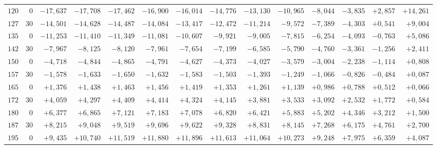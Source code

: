 \begin{landscape}
\begin{longtable}{@{}rr|r|r|r|r|r|r|r|r|r|r|r|r@{}}
\(120\) & \(0\) & \(-17{,}637\) & \(-17{,}708\) & \(-17{,}462\) & \(-16{,}900\) & \(-16{,}014\) & \(-14{,}776\) & \(-13{,}130\) & \(-10{,}965\) & \(-8{,}044\) & \(-3{,}835\) & \(+2{,}857\) & \(+14{,}261\)\\
\(127\) & \(30\) & \(-14{,}501\) & \(-14{,}628\) & \(-14{,}487\) & \(-14{,}084\) & \(-13{,}417\) & \(-12{,}472\) & \(-11{,}214\) & \(-9{,}572\) & \(-7{,}389\) & \(-4{,}303\) & \(+0{,}541\) & \(+9{,}004\)\\
\(135\) & \(0\) & \(-11{,}253\) & \(-11{,}410\) & \(-11{,}349\) & \(-11{,}081\) & \(-10{,}607\) & \(-9{,}921\) & \(-9{,}005\) & \(-7{,}815\) & \(-6{,}254\) & \(-4{,}093\) & \(-0{,}763\) & \(+5{,}086\)\\
\(142\) & \(30\) & \(-7{,}967\) & \(-8{,}125\) & \(-8{,}120\) & \(-7{,}961\) & \(-7{,}654\) & \(-7{,}199\) & \(-6{,}585\) & \(-5{,}790\) & \(-4{,}760\) & \(-3{,}361\) & \(-1{,}256\) & \(+2{,}411\)\\[2pt]
\(150\) & \(0\) & \(-4{,}718\) & \(-4{,}844\) & \(-4{,}865\) & \(-4{,}791\) & \(-4{,}627\) & \(-4{,}373\) & \(-4{,}027\) & \(-3{,}579\) & \(-3{,}004\) & \(-2{,}238\) & \(-1{,}114\) & \(+0{,}808\)\\
\(157\) & \(30\) & \(-1{,}578\) & \(-1{,}633\) & \(-1{,}650\) & \(-1{,}632\) & \(-1{,}583\) & \(-1{,}503\) & \(-1{,}393\) & \(-1{,}249\) & \(-1{,}066\) & \(-0{,}826\) & \(-0{,}484\) & \(+0{,}087\)\\
\(165\) & \(0\) & \(+1{,}376\) & \(+1{,}438\) & \(+1{,}463\) & \(+1{,}456\) & \(+1{,}419\) & \(+1{,}353\) & \(+1{,}261\) & \(+1{,}139\) & \(+0{,}986\) & \(+0{,}788\) & \(+0{,}512\) & \(+0{,}066\)\\
\(172\) & \(30\) & \(+4{,}059\) & \(+4{,}297\) & \(+4{,}409\) & \(+4{,}414\) & \(+4{,}324\) & \(+4{,}145\) & \(+3{,}881\) & \(+3{,}533\) & \(+3{,}092\) & \(+2{,}532\) & \(+1{,}772\) & \(+0{,}584\)\\[2pt]
\(180\) & \(0\) & \(+6{,}377\) & \(+6{,}865\) & \(+7{,}121\) & \(+7{,}183\) & \(+7{,}078\) & \(+6{,}820\) & \(+6{,}421\) & \(+5{,}883\) & \(+5{,}202\) & \(+4{,}346\) & \(+3{,}212\) & \(+1{,}500\)\\
\(187\) & \(30\) & \(+8{,}215\) & \(+9{,}048\) & \(+9{,}519\) & \(+9{,}696\) & \(+9{,}622\) & \(+9{,}328\) & \(+8{,}831\) & \(+8{,}145\) & \(+7{,}268\) & \(+6{,}175\) & \(+4{,}761\) & \(+2{,}700\)\\
\(195\) & \(0\) & \(+9{,}435\) & \(+10{,}740\) & \(+11{,}519\) & \(+11{,}880\) & \(+11{,}896\) & \(+11{,}613\) & \(+11{,}064\) & \(+10{,}273\) & \(+9{,}248\) & \(+7{,}975\) & \(+6{,}359\) & \(+4{,}087\)\\

\end{longtable}
\end{landscape}
